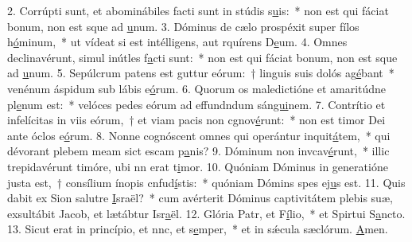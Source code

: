 2. Corrúpti sunt, et abominábiles facti sunt in stúdis s\uline{u}is:~* non est qui fáciat bonum, non est sque ad \uline{u}num.
3. Dóminus de cælo prospéxit super fílos h\uline{ó}minum,~* ut vídeat si est intélligens, aut rquírens D\uline{e}um.
4. Omnes declinavérunt, simul inútles f\uline{a}cti sunt:~* non est qui fáciat bonum, non est sque ad \uline{u}num.
5. Sepúlcrum patens est guttur eórum:~† linguis suis dolós ag\uline{é}bant~* venénum áspidum sub lábis e\uline{ó}rum.
6. Quorum os maledictióne et amaritúdne pl\uline{e}num est:~* velóces pedes eórum ad effundndum sán\uline{gui}nem.
7. Contrítio et infelícitas in viis eórum,~† et viam pacis non cgnov\uline{é}runt:~* non est timor Dei ante óclos e\uline{ó}rum.
8. Nonne cognóscent omnes qui operántur inquit\uline{á}tem,~* qui dévorant plebem meam sict escam p\uline{a}nis?
9. Dóminum non invcav\uline{é}runt,~* illic trepidavérunt timóre, ubi nn erat t\uline{i}mor.
10. Quóniam Dóminus in generatióne justa est,~† consílium ínopis cnfud\uline{í}stis:~* quóniam Dómins spes ej\uline{u}s est.
11. Quis dabit ex Sion salutre \uline{I}sraël?~* cum avérterit Dóminus captivitátem plebis suæ, exsultábit Jacob, et lætábtur Isr\uline{a}ël.
12. Glória Patr, et F\uline{í}lio,~* et Spirtui S\uline{a}ncto.
13. Sicut erat in princípio, et nnc, et s\uline{e}mper,~* et in sǽcula sæclórum. \uline{A}men.
